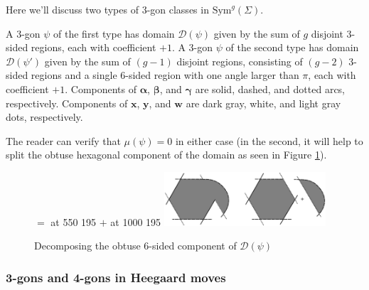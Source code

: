 \documentclass[11pt]{article}
\theoremstyle{plain} \newtheorem{thm}{Theorem}[subsection]
\theoremstyle{plain} \newtheorem{cor}[thm]{Corollary}
\theoremstyle{plain} \newtheorem{prop}[thm]{Proposition}
\theoremstyle{plain} \newtheorem{conj}[thm]{Conjecture}
\theoremstyle{plain} \newtheorem{lem}[thm]{Lemma}
\theoremstyle{definition} \newtheorem{df}[thm]{Definition}
\theoremstyle{remark} \newtheorem{rmk}[thm]{Remark}
\theoremstyle{remark} \newtheorem{obs}[thm]{Observation}
\newcommand{\Symg}{\text{Sym}^{g}(\Sigma)}
\newcommand{\ba}{\boldsymbol{\alpha}}
\newcommand{\bb}{\boldsymbol{\beta}}
\newcommand{\bg}{\boldsymbol{\gamma}}
\newcommand{\bx}{\mathbf{x}}
\newcommand{\by}{\mathbf{y}}
\newcommand{\bw}{\mathbf{w}}
\begin{document}
Here we'll discuss two types of 3-gon classes in $\Symg$.

A 3-gon $\psi$ of the first type has domain $\mathcal{D}(\psi)$ given by the sum of $g$ disjoint 3-sided regions, each with coefficient $+1$.  A 3-gon $\psi$ of the second type has domain $\mathcal{D}(\psi')$ given by the sum of $(g-1)$ disjoint regions, consisting of $(g-2)$ 3-sided regions and a single 6-sided region with one angle larger than $\pi$, each with coefficient $+1$.  Components of $\ba$, $\bb$, and $\bg$ are solid, dashed, and dotted arcs, respectively.  Components of $\bx$, $\by$, and $\bw$ are dark gray, white, and light gray dots, respectively.

The reader can verify that $\mu\left(\psi\right)=0$ in either case (in the second, it will help to split the obtuse hexagonal component of the domain as seen in Figure \ref{fig:trisplit}).

\begin{figure}[h!]
\centering
\begin{minipage}[c]{.45\linewidth}
\pinlabel* $=$ at 550 195
\pinlabel* $+$ at 1000 195
\endlabellist
\includegraphics[height = 20mm]{TriSplit}
\end{minipage}
\begin{minipage}[c]{.53\linewidth}
\caption[Type II 3-gon decomposition]{Decomposing the obtuse 6-sided component of $\mathcal{D}(\psi)$
\label{fig:trisplit}}
\end{minipage}
\end{figure}

\subsubsection{3-gons and 4-gons in Heegaard moves}\label{sec:movegons}
\end{document}
